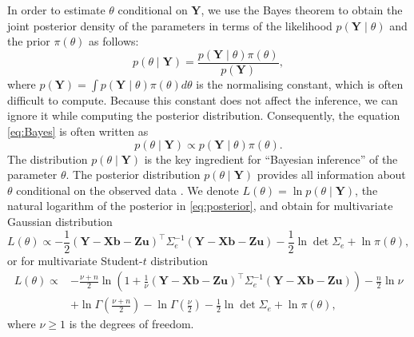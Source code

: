 \documentclass[a4paper]{article}   	%
\begin{document}
	In order to estimate $\theta$ conditional on $\bm{Y}$, we use the Bayes theorem to obtain the joint posterior density of the parameters in terms of the likelihood $p(\bm{Y}\mid\theta)$ and the prior $\pi(\theta)$ as follows:
	\begin{equation}\label{eq:Bayes}
		p(\theta\mid \bm{Y}) = \frac{p(\bm{Y}\mid\theta)\pi(\theta)}{p(\bm{Y})},
	\end{equation}
	where $p(\bm{Y}) = \int p(\bm{Y}\mid\theta)\pi(\theta) d\theta$ is the normalising constant, which is often difficult to compute. Because this constant does not affect the inference, we can ignore it while computing the posterior distribution. Consequently, the equation \eqref{eq:Bayes} is often written as 
	\begin{equation}\label{eq:posterior}
		p(\theta\mid \bm{Y}) \propto p(\bm{Y}\mid\theta)\pi(\theta).
	\end{equation}
The distribution $p(\theta\mid \bm{Y})$ is the key ingredient for ``Bayesian inference'' of the parameter $\theta$. The posterior distribution $p(\theta\mid \bm{Y})$ provides all information about $\theta$ conditional on the observed data \parencite{Che2010Bayesian}. We denote $L(\theta)=\ln p(\theta\mid\bm{Y})$, the natural logarithm of the posterior in \eqref{eq:posterior}, and obtain for multivariate Gaussian distribution 
	\begin{equation}\label{eq:logGpost}
		L(\theta) \propto -\frac{1}{2} (\bm{Y}-\bm{X}\bm{b}-\bm{Z}\bm{u})^\top \Sigma_e^{-1}(\bm{Y}-\bm{X}\bm{b}-\bm{Z}\bm{u}) -\frac{1}{2}\ln\det\Sigma_e + \ln \pi(\theta),
	\end{equation}
	or for multivariate Student-$t$ distribution
	\begin{equation}\label{eq:logTpost}
		\begin{split}
			L(\theta) \propto &-\frac{\nu+n}{2}\ln \left( 
			1+\frac{1}{\nu}(\bm{Y}-\bm{X}\bm{b}-\bm{Z}\bm{u})^\top\Sigma_e^{-1}(\bm{Y}-\bm{X}\bm{b}-\bm{Z}\bm{u})  \right) -\frac{n}{2}\ln\nu \\ &+ \ln \Gamma(\frac{\nu+n}{2}) - \ln\Gamma(\frac{\nu}{2})-\frac{1}{2}\ln\det \Sigma_e + \ln \pi(\theta),
		\end{split}
	\end{equation}
	where $\nu\geq 1$ is the degrees of freedom. 
	
\end{document}
